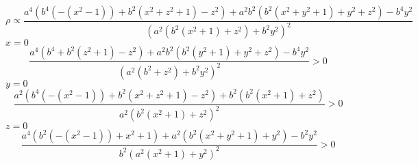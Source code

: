 \documentclass[12pt,a4paper,oneside]{book}
\begin{document}
\begin{equation}
\rho \propto \frac{a^4 \left(b^4 \left(-\left(x^2-1\right)\right)+b^2 \left(x^2+z^2+1\right)-z^2\right)+a^2 b^2 \left(b^2 \left(x^2+y^2+1\right)+y^2+z^2\right)-b^4 y^2}{\left(a^2 \left(b^2 \left(x^2+1\right)+z^2\right)+b^2 y^2\right)^2}
\end{equation}
$x=0$
\begin{equation}
\frac{a^4 \left(b^4+b^2 \left(z^2+1\right)-z^2\right)+a^2 b^2 \left(b^2 \left(y^2+1\right)+y^2+z^2\right)-b^4 y^2}{\left(a^2 \left(b^2+z^2\right)+b^2 y^2\right)^2} > 0
\end{equation}
$y=0$
\begin{equation}
\frac{a^2 \left(b^4 \left(-\left(x^2-1\right)\right)+b^2 \left(x^2+z^2+1\right)-z^2\right)+b^2 \left(b^2 \left(x^2+1\right)+z^2\right)}{a^2 \left(b^2 \left(x^2+1\right)+z^2\right)^2} > 0
\end{equation}
$z=0$
\begin{equation}
\frac{a^4 \left(b^2 \left(-\left(x^2-1\right)\right)+x^2+1\right)+a^2 \left(b^2 \left(x^2+y^2+1\right)+y^2\right)-b^2 y^2}{b^2 \left(a^2 \left(x^2+1\right)+y^2\right)^2} > 0
\end{equation}
\end{document}
